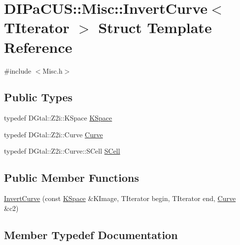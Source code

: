 \hypertarget{structDIPaCUS_1_1Misc_1_1InvertCurve}{}\section{D\+I\+Pa\+C\+US\+:\+:Misc\+:\+:Invert\+Curve$<$ T\+Iterator $>$ Struct Template Reference}
\label{structDIPaCUS_1_1Misc_1_1InvertCurve}


{\ttfamily \#include $<$Misc.\+h$>$}

\subsection*{Public Types}
\begin{DoxyCompactItemize}
\item 
typedef D\+Gtal\+::\+Z2i\+::\+K\+Space \mbox{\hyperlink{structDIPaCUS_1_1Misc_1_1InvertCurve_a64773d7b4da91e66b4cc83112d4aa1d1}{K\+Space}}
\item 
typedef D\+Gtal\+::\+Z2i\+::\+Curve \mbox{\hyperlink{structDIPaCUS_1_1Misc_1_1InvertCurve_a4a338524a4f9be41169d6eeb519c6a20}{Curve}}
\item 
typedef D\+Gtal\+::\+Z2i\+::\+Curve\+::\+S\+Cell \mbox{\hyperlink{structDIPaCUS_1_1Misc_1_1InvertCurve_a57f4545d1903fd3953018413c6fd61aa}{S\+Cell}}
\end{DoxyCompactItemize}
\subsection*{Public Member Functions}
\begin{DoxyCompactItemize}
\item 
\mbox{\hyperlink{structDIPaCUS_1_1Misc_1_1InvertCurve_a551b582c8c9abf2f86937a7c7468491e}{Invert\+Curve}} (const \mbox{\hyperlink{structDIPaCUS_1_1Misc_1_1InvertCurve_a64773d7b4da91e66b4cc83112d4aa1d1}{K\+Space}} \&K\+Image, T\+Iterator begin, T\+Iterator end, \mbox{\hyperlink{structDIPaCUS_1_1Misc_1_1InvertCurve_a4a338524a4f9be41169d6eeb519c6a20}{Curve}} \&c2)
\end{DoxyCompactItemize}


\subsection{Member Typedef Documentation}
\mbox{\label{structDIPaCUS_1_1Misc_1_1InvertCurve_a4a338524a4f9be41169d6eeb519c6a20}} 

